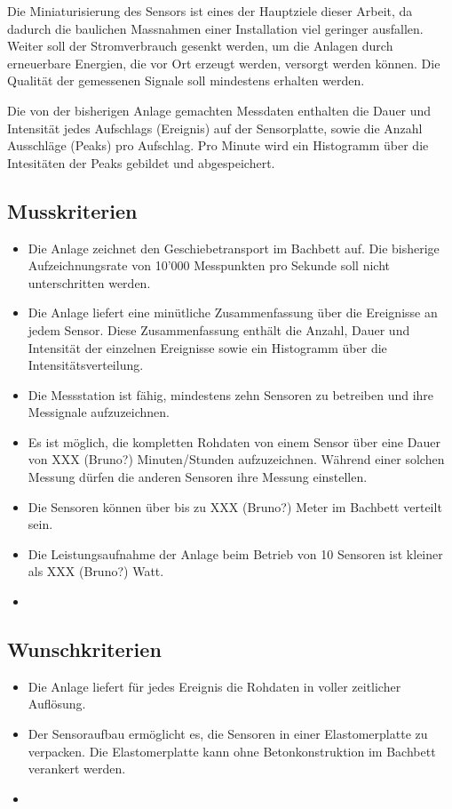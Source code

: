 Die Miniaturisierung des Sensors ist eines der Hauptziele dieser Arbeit, da dadurch die baulichen Massnahmen einer Installation viel geringer ausfallen. Weiter soll der Stromverbrauch gesenkt werden, um die Anlagen durch erneuerbare Energien, die vor Ort erzeugt werden, versorgt werden können. Die Qualität der gemessenen Signale soll mindestens erhalten werden.

Die von der bisherigen Anlage gemachten Messdaten enthalten die Dauer und Intensität jedes Aufschlags (Ereignis) auf der Sensorplatte, sowie die Anzahl Ausschläge (Peaks) pro Aufschlag. Pro Minute wird ein Histogramm über die Intesitäten der Peaks gebildet und abgespeichert.

\subsection{Musskriterien}
\begin{itemize}
\item Die Anlage zeichnet den Geschiebetransport im Bachbett auf. Die bisherige Aufzeichnungsrate von 10'000 Messpunkten pro Sekunde soll nicht unterschritten werden.
\item Die Anlage liefert eine minütliche Zusammenfassung über die Ereignisse an jedem Sensor. Diese Zusammenfassung enthält die Anzahl, Dauer und Intensität der einzelnen Ereignisse sowie ein Histogramm über die Intensitätsverteilung.
\item Die Messstation ist fähig, mindestens zehn Sensoren zu betreiben und ihre Messignale aufzuzeichnen.
\item Es ist möglich, die kompletten Rohdaten von einem Sensor über eine Dauer von XXX (Bruno?) Minuten/Stunden aufzuzeichnen. Während einer solchen Messung dürfen die anderen Sensoren ihre Messung einstellen.
\item Die Sensoren können über bis zu XXX (Bruno?) Meter im Bachbett verteilt sein.
\item Die Leistungsaufnahme der Anlage beim Betrieb von 10 Sensoren ist kleiner als XXX (Bruno?) Watt.
\item
\end{itemize}
\subsection{Wunschkriterien}
\begin{itemize}
\item Die Anlage liefert für jedes Ereignis die Rohdaten in voller zeitlicher Auflösung.
\item Der Sensoraufbau ermöglicht es, die Sensoren in einer Elastomerplatte zu verpacken. Die Elastomerplatte kann ohne Betonkonstruktion im Bachbett verankert werden.
\item 
\end{itemize}

